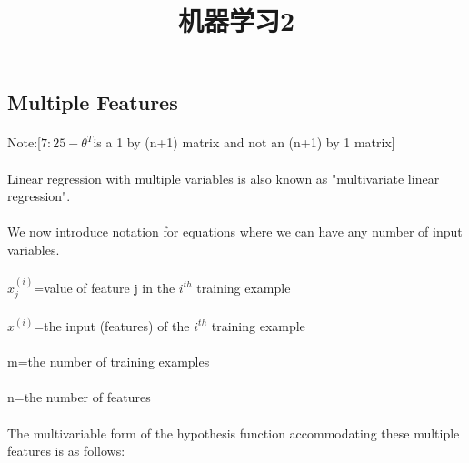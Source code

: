 \documentclass{article}
\begin{document}
\begin{CJK}{UTF8}{gbsn}

\title{机器学习2}
\date{}
\maketitle
\section{Multiple Features}
\paragraph{}

Note:[$7:25-\theta^{T}$is a 1 by (n+1) matrix and not an (n+1) by 1 matrix]

\paragraph{}
Linear regression with multiple variables is also known as "multivariate linear regression".
\paragraph{}
We now introduce notation for equations where we can have any number of input variables.
\paragraph{}
\begin{algorithm}  
\paragraph{} 
$ {x}_j^{(i)} $=value of feature j in the $i^{th}$ training example
\paragraph{}
$x^{(i)}$=the input (features) of the $i^{th}$ training example
\paragraph{}
m=the number of training examples
\paragraph{}
n=the number of features
\end{algorithm} 
\paragraph{}
The multivariable form of the hypothesis function accommodating these multiple features is as follows:

\end{CJK}
\end{document}
